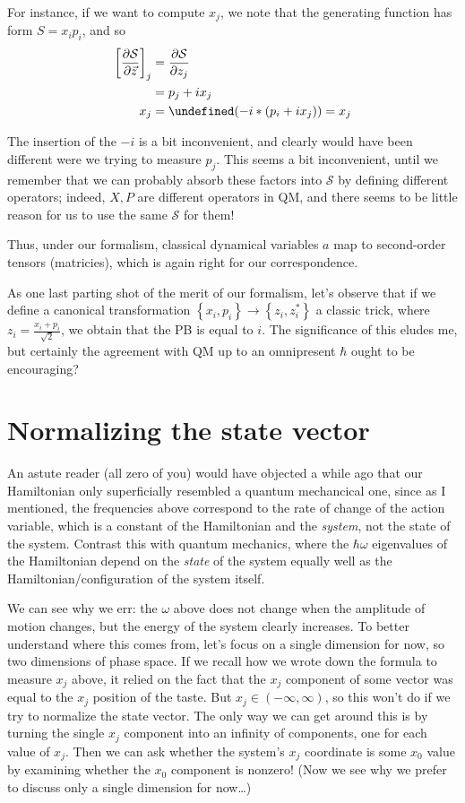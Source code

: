 \documentclass[12pt]{report}
\newcommand{\pd}[2]{\frac{\partial#1}{\partial#2}}
\let\Re\undefined
\DeclareMathOperator{\Re}{Re}
\begin{document}
For instance, if we want to compute $x_j$, we note that the generating function
has form $S = x_ip_i$, and so
\begin{align}
    \left[ \pd{\mathcal{S}}{\vec{z}} \right]_j &= \pd{\mathcal{S}}{z_j}\\
    &= p_j + ix_j\\
    x_j &= \Re(-i * (p_i + ix_j)) = x_j
\end{align}

The insertion of the $-i$ is a bit inconvenient, and clearly would have been
different were we trying to measure $p_j$. This seems a bit inconvenient, until
we remember that we can probably absorb these factors into $\mathcal{S}$ by
defining different operators; indeed, $X,P$ are different operators in QM, and
there seems to be little reason for us to use the same $\mathcal{S}$ for them!

Thus, under our formalism, classical dynamical variables $a$ map to second-order
tensors (matricies), which is again right for our correspondence.

As one last parting shot of the merit of our formalism, let's observe that if we
define a canonical transformation $\left\{ x_i, p_i \right\} \to \left\{ z_i,
z_i^* \right\}$ a classic trick, where $z_i = \frac{x_i + p_i}{\sqrt{2}}$, we
obtain that the PB is equal to $i$. The significance of this eludes me, but
certainly the agreement with QM up to an omnipresent $\hbar$ ought to be
encouraging?


\section{Normalizing the state vector}

An astute reader (all zero of you) would have objected a while ago that our
Hamiltonian only superficially resembled a quantum mechancical one, since as I
mentioned, the frequencies above correspond to the rate of change of the action
variable, which is a constant of the Hamiltonian and the \emph{system}, not the
state of the system. Contrast this with quantum mechanics, where the $\hbar
\omega$ eigenvalues of the Hamiltonian depend on the \emph{state} of the system
equally well as the Hamiltonian/configuration of the system itself.

We can see why we err: the $\omega$ above does not change when the amplitude of
motion changes, but the energy of the system clearly increases. To better
understand where this comes from, let's focus on a single dimension for now, so
two dimensions of phase space. If we recall how we wrote down the formula to
measure $x_j$ above, it relied on the fact that the $x_j$ component of some
vector was equal to the $x_j$ position of the taste. But $x_j \in \left(
-\infty,\infty \right)$, so this won't do if we try to normalize the state
vector. The only way we can get around this is by turning the single $x_j$
component into an infinity of components, one for each value of $x_j$. Then we
can ask whether the system's $x_j$ coordinate is some $x_0$ value by examining
whether the $x_0$ component is nonzero! (Now we see why we prefer to discuss
only a single dimension for now\dots)
\end{document}
